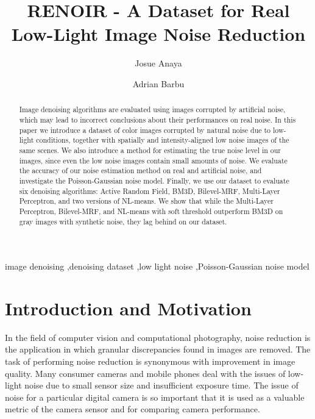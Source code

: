 \documentclass[review]{elsarticle}
\begin{document}
\begin{frontmatter}

\title{RENOIR - A Dataset for Real Low-Light Image Noise Reduction}

\author[mymainaddress]{Josue Anaya}
\author[mymainaddress]{Adrian Barbu}
\address{}



\address[mymainaddress]{Department of Statistics, Florida State University, 117 N Woodward Ave, Tallahassee FL 32306, USA}




\begin{abstract}

Image denoising algorithms are evaluated using images corrupted by artificial noise, which may lead to incorrect conclusions about their performances on real noise. In this paper we introduce a dataset of color images corrupted by natural noise due to low-light conditions, together with spatially and intensity-aligned low noise images of the same scenes. We also introduce a method for estimating the true noise level in our images, since even the low noise images contain small amounts of noise. We evaluate the accuracy of our noise estimation method on real and artificial noise, and investigate the Poisson-Gaussian noise model. Finally, we use our dataset to evaluate six denoising algorithms: Active Random Field, BM3D, Bilevel-MRF, Multi-Layer Perceptron, and two versions of NL-means. We show that while the Multi-Layer Perceptron, Bilevel-MRF, and NL-means with soft threshold  outperform BM3D on gray images with synthetic noise, they lag behind on our dataset.

\end{abstract}
\begin{keyword}
image denoising \sep denoising dataset \sep low light noise \sep Poisson-Gaussian noise model
\end{keyword}

\end{frontmatter}



\section{Introduction and Motivation}

In the field of computer vision and computational photography, noise reduction is the application in which granular discrepancies found in images are removed. The task of performing noise reduction is synonymous with improvement in image quality. Many consumer  cameras and mobile phones deal with the issues of low-light noise due to small sensor size and insufficient exposure time. The issue of noise for a particular digital camera is so important that it is used as a valuable metric of the camera sensor and for comparing camera performance\cite{dxomark}. 
\end{document}
